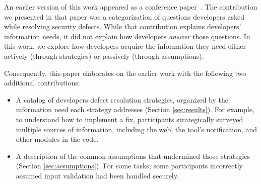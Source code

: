 \documentclass[10pt,journal,compsoc]{IEEEtran}
\begin{document}
%
%
%
%

An earlier version of this work appeared as a conference paper~\cite{Smith2015Questions}. 
The contribution we presented in that paper was a categorization of questions developers asked while resolving security defects.
While that contribution explains developers' information needs, it did not explain how developers \textit{answer} those questions.
In this work, we explore how developers acquire the information they need either actively (through strategies) or passively (through assumptions).


Consequently, this paper elaborates on the earlier work with the following two additional contributions:

\begin{itemize}
	\item A catalog of developers defect resolution strategies, organized by the information need each strategy addresses (Section \ref{sec:results}). 
	For example, to understand how to implement a fix, participants strategically surveyed multiple sources of information, including the web, the tool's notification, and other modules in the code.
	\item A description of the common assumptions that undermined those strategies (Section \ref{sec:assumptions}). 
	For some tasks, some participants incorrectly assumed input validation had been handled securely.
\end{itemize}
\end{document}
